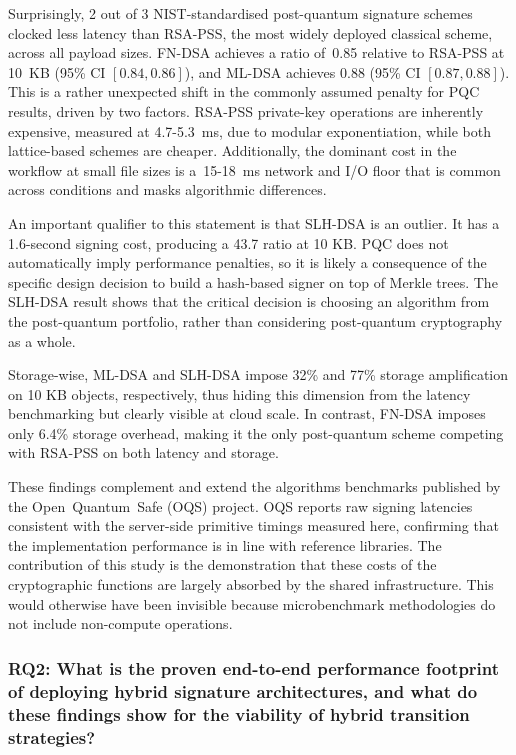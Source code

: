 \documentclass[12pt,a4paper]{article}
\begin{document}
Surprisingly, 2 out of 3 NIST-standardised post-quantum signature schemes clocked less latency than RSA-PSS, the most widely deployed classical scheme, across all payload sizes. FN-DSA achieves a ratio of~0.85 relative to RSA-PSS at 10~KB (95\% CI $[0.84, 0.86]$), and ML-DSA achieves 0.88 (95\% CI $[0.87, 0.88]$). This is a rather unexpected shift in the commonly assumed penalty for PQC results, driven by two factors. RSA-PSS private-key operations are inherently expensive, measured at 4.7-5.3~ms, due to modular exponentiation, while both lattice-based schemes are cheaper. Additionally, the dominant cost in the workflow at small file sizes is a~15-18~ms network and I/O floor that is common across conditions and masks algorithmic differences.

An important qualifier to this statement is that SLH-DSA is an outlier. It has a 1.6-second signing cost, producing a 43.7 ratio at 10 KB. PQC does not automatically imply performance penalties, so it is likely a consequence of the specific design decision to build a hash-based signer on top of Merkle trees. The SLH-DSA result shows that the critical decision is choosing an algorithm from the post-quantum portfolio, rather than considering post-quantum cryptography as a whole.

Storage-wise, ML-DSA and SLH-DSA impose 32\% and 77\% storage amplification on 10 KB objects, respectively, thus hiding this dimension from the latency benchmarking but clearly visible at cloud scale. In contrast, FN-DSA imposes only 6.4\% storage overhead, making it the only post-quantum scheme competing with RSA-PSS on both latency and storage.

These findings complement and extend the algorithms benchmarks published by the Open~Quantum~Safe (OQS) project. OQS reports raw signing latencies consistent with the server-side primitive timings measured here, confirming that the implementation performance is in line with reference libraries. The contribution of this study is the demonstration that these costs of the cryptographic functions are largely absorbed by the shared infrastructure. This would otherwise have been invisible because microbenchmark methodologies do not include non-compute operations.

\subsubsection{RQ2: What is the proven end-to-end performance footprint of deploying hybrid signature architectures, and what do these findings show for the viability of hybrid transition strategies?}
\end{document}
